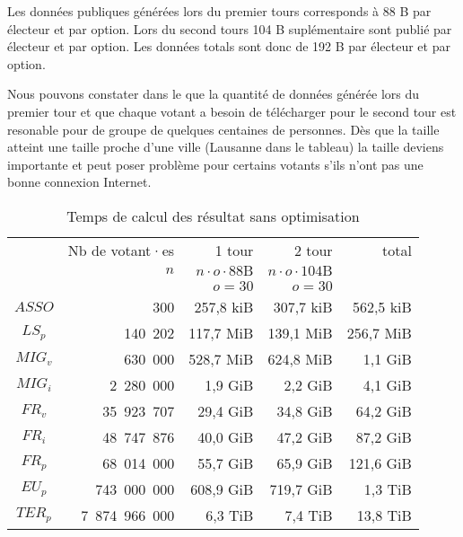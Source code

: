 \documentclass[../report]{subfiles}
\begin{document}
Les données publiques générées lors du premier tours corresponds à 88 B par électeur et par option.
Lors du second tours 104 B suplémentaire sont publié par électeur et par option.
Les données totals sont donc de 192 B par électeur et par option.

Nous pouvons constater dans le  que la quantité de données générée lors du premier tour et
que chaque votant a besoin de télécharger pour le second tour est resonable pour de groupe de quelques centaines de personnes.
Dès que la taille atteint une taille proche d'une ville (Lausanne dans le tableau) la taille deviens importante et peut poser
problème pour certains votants s'ils n'ont pas une bonne connexion Internet.


\begin{table}[H]
  \begin{center}
    \begin{tabular}{|c|r|r|r|r|}
      \hline
       & Nb de votant·es      & 1\up{er} tour                & 2\up{nd} tour & total\\
       & $n$                  & $n \cdot o \cdot 88\text{B}$ & $n \cdot o \cdot 104\text{B}$  &  \\
      \hline
       &                      & $o = 30$ & $o = 30$ &                    \\
      \hline
      \hline
      $ASSO$  &           300 & 257,8 kiB & 307,7 kiB & 562,5 kiB \\
      $LS_p$  &       140~202 & 117,7 MiB & 139,1 MiB & 256,7 MiB \\
      $MIG_v$ &       630~000 & 528,7 MiB & 624,8 MiB &   1,1 GiB \\
      $MIG_i$ &     2~280~000 &   1,9 GiB &   2,2 GiB &   4,1 GiB \\
      $FR_v$  &    35~923~707 &  29,4 GiB &  34,8 GiB &  64,2 GiB \\
      $FR_i$  &    48~747~876 &  40,0 GiB &  47,2 GiB &  87,2 GiB \\
      $FR_p$  &    68~014~000 &  55,7 GiB &  65,9 GiB & 121,6 GiB \\
      $EU_p$  &   743~000~000 & 608,9 GiB & 719,7 GiB &   1,3 TiB \\
      $TER_p$ & 7~874~966~000 &   6,3 TiB &   7,4 TiB &  13,8 TiB \\
      \hline
    \end{tabular}
  \end{center}
  \caption{Temps de calcul des résultat sans optimisation}\label{tab:res:perf:size}
\end{table}
\end{document}
